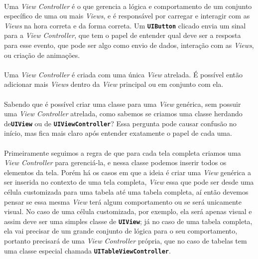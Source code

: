 \documentclass[a4paper,12pt,brazil,doubleside]{book}
\begin{document}
\paragraph{}Uma \emph{View Controller} é o que gerencia a lógica e comportamento de um conjunto específico de uma ou mais \emph{Views}, e é responsável por carregar e interagir com as \emph{Views} na hora correta e da forma correta. Um \texttt{\textbf{UIButton}} clicado envia um sinal para a \emph{View Controller}, que tem o papel de entender qual deve ser a resposta para esse evento, que pode ser algo como envio de dados, interação com as \emph{Views}, ou criação de animações.
\paragraph{}Uma \emph{View Controller} é criada com uma única \emph{View} atrelada. É possível então adicionar mais \emph{Views} dentro da \emph{View} principal ou em conjunto com ela.
\paragraph{}Sabendo que é possível criar uma classe para uma \emph{View} genérica, sem possuir uma \emph{View Controller} atrelada, como sabemos se criamos uma classe herdando de\texttt{\textbf{UIView}} ou de \texttt{\textbf{UIViewController}}? Essa pergunta pode causar confusão no início, mas fica mais claro após entender exatamente o papel de cada uma.
\paragraph{}Primeiramente seguimos a regra de que para cada tela completa criamos uma \emph{View Controller} para gerenciá-la, e nessa classe podemos inserir todos os elementos da tela. Porém há os casos em que a ideia é criar uma \emph{View} genérica a ser inserida no contexto de uma tela completa, \emph{View} essa que pode ser desde uma célula customizada para uma tabela até uma tabela completa, aí então devemos pensar se essa mesma \emph{View} terá algum comportamento ou se será unicamente visual. No caso de uma célula customizada, por exemplo, ela será apenas visual e assim deve ser uma simples classe de \texttt{\textbf{UIView}}; já no caso de uma tabela completa, ela vai precisar de um grande conjunto de lógica para o seu comportamento, portanto precisará de uma \emph{View Controller} própria, que no caso de tabelas tem uma classe especial chamada \texttt{\textbf{UITableViewController}}.
\end{document}
